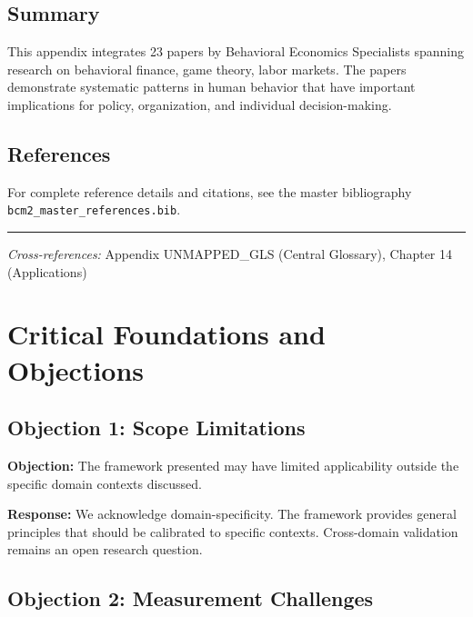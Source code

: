 \subsection{Summary}

This appendix integrates 23 papers by Behavioral Economics Specialists
spanning research on behavioral finance, game theory, labor markets.
The papers demonstrate systematic patterns in human behavior that have important
implications for policy, organization, and individual decision-making.

\subsection{References}

For complete reference details and citations, see the master bibliography
\texttt{bcm2\_master\_references.bib}.

\vspace{1em}
\hrule
\vspace{0.5em}

\noindent\textit{Cross-references:}
Appendix UNMAPPED_GLS (Central Glossary), Chapter 14 (Applications)



\section{Critical Foundations and Objections}
\label{sec:spc-foundations}

\subsection{Objection 1: Scope Limitations}

\textbf{Objection:} The framework presented may have limited applicability
outside the specific domain contexts discussed.

\textbf{Response:} We acknowledge domain-specificity. The framework provides
general principles that should be calibrated to specific contexts. Cross-domain
validation remains an open research question.

\subsection{Objection 2: Measurement Challenges}

